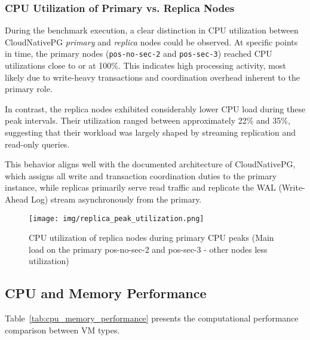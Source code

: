 \subsubsection{CPU Utilization of Primary vs. Replica Nodes}

During the benchmark execution, a clear distinction in CPU utilization between CloudNativePG \emph{primary} and \emph{replica} nodes could be observed. At specific points in time, the primary nodes (\texttt{pos-no-sec-2} and \texttt{pos-sec-3}) reached CPU utilizations close to or at 100\%. This indicates high processing activity, most likely due to write-heavy transactions and coordination overhead inherent to the primary role.

In contrast, the replica nodes exhibited considerably lower CPU load during these peak intervals. Their utilization ranged between approximately 22\% and 35\%, suggesting that their workload was largely shaped by streaming replication and read-only queries.

This behavior aligns well with the documented architecture of CloudNativePG, which assigns all write and transaction coordination duties to the primary instance, while replicas primarily serve read traffic and replicate the WAL (Write-Ahead Log) stream asynchronously from the primary\parencite{cloudnativepg_architecture}.

\begin{figure}[H]
    \centering
    \texttt{[image: img/replica\_peak\_utilization.png]}
    \caption{CPU utilization of replica nodes during primary CPU peaks (Main load on the primary pos-no-sec-2 and pos-sec-3 - other nodes less utilization)}
    \label{fig:replica_cpu}
\end{figure}

\subsection{CPU and Memory Performance}

Table~\ref{tab:cpu_memory_performance} presents the computational performance comparison between VM types.

